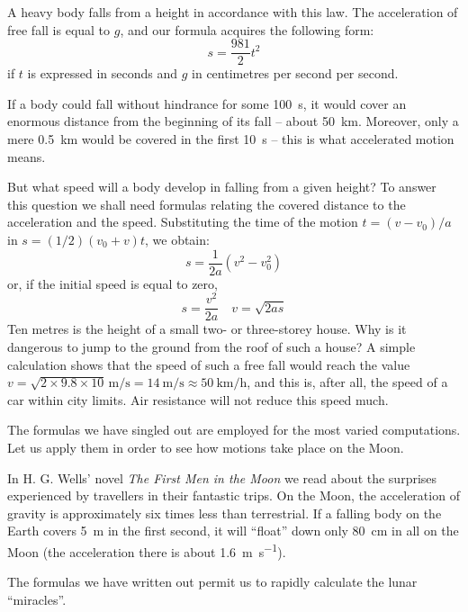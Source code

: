 A heavy body falls from a height in accordance with this law. The acceleration of free fall is equal to $g$, and
our formula acquires the following form:
\begin{equation*}
s = \frac{981}{2} t^{2}
\end{equation*}
if $t$ is expressed in seconds and $g$ in centimetres per second per second.

If a body could fall without hindrance for some \SI{100}{\second},
it would cover an enormous distance from the beginning
of its fall -- about \SI{50}{\kilo\meter}. Moreover, only a mere \SI{0.5}{\kilo\meter} would be covered in the first \SI{10}{\second} -- this is what accelerated motion means.

But what speed will a body develop in falling from a
given height? To answer this question we shall need formulas relating the covered distance to the acceleration and the speed. Substituting the time of the motion $t = (v - v_{0})/a$ in $s = (1/2)(v_{0}+v) t$, we obtain:
\begin{equation*}
s = \frac{1}{2a}(v^{2} - v_{0}^{2})
\label{dist-time-acc}
\end{equation*}
or, if the initial speed is equal to zero,
\begin{equation*}
s = \frac{v^{2}}{2a} \quad v =\sqrt{2as}
\end{equation*}
Ten metres is the height of a small two- or three-storey
house. Why is it dangerous to jump to the ground from
the roof of such a house? A simple calculation shows that
the speed of such a free fall would reach the value $v =
\sqrt{2 \times 9.8 \times 10} \, \si{\meter\per\second} = \SI{14}{\meter\per\second} \approx \SI{50}{\kilo\meter\per\hour}$, and this
is, after all, the speed of a car within city limits.
Air resistance will not reduce this speed much.

The formulas we have singled out are employed for
the most varied computations. Let us apply them in order
to see how motions take place on the Moon.

In H. G. Wells' novel \emph{The First Men in the Moon} we read
about the surprises experienced by travellers in their
fantastic trips. On the Moon, the acceleration of gravity
is approximately six times less than terrestrial. If a falling body on the Earth covers \SI{5}{\meter} in the first second, it
will ``float'' down only \SI{80}{\centi\meter} in all on the Moon (the acceleration there is about \SI{1.6}{\meter\per\second}).

The formulas we have written out permit us to rapidly
calculate the lunar ``miracles''.

